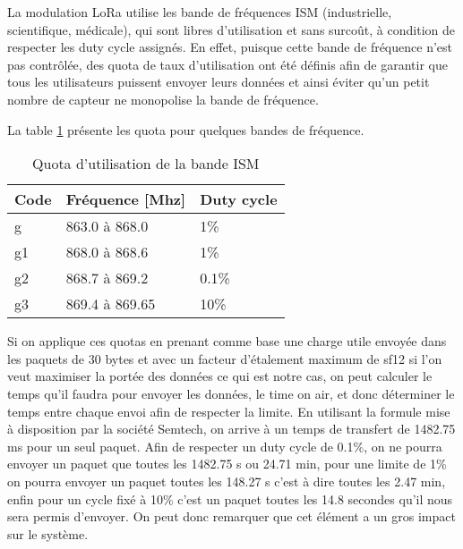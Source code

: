 La modulation LoRa utilise les bande de fréquences ISM (industrielle, scientifique, médicale), qui sont libres d'utilisation et sans surcoût, à condition de respecter les duty cycle assignés. En effet, puisque cette bande de fréquence n'est pas contrôlée, des quota de taux d'utilisation ont été définis afin de garantir que tous les utilisateurs puissent envoyer leurs données et ainsi éviter qu'un petit nombre de capteur ne monopolise la bande de fréquence. \cite{ism_bands}

La table \ref{tab:bande_ism} présente les quota pour quelques bandes de fréquence.

\begin{table}[htb]
\caption{Quota d'utilisation de la bande ISM}
\label{tab:bande_ism}
\centering
\begin{tabular}{ l l l }
\toprule
Code & Fréquence [Mhz] & Duty cycle \\
\midrule
g & 863.0 à 868.0 & 1\% \\
g1 & 868.0 à 868.6 & 1\% \\
g2 & 868.7 à 869.2 & 0.1\% \\
g3 & 869.4 à 869.65 & 10\% \\
\bottomrule 
\end{tabular}
\end{table}

Si on applique ces quotas en prenant comme base une charge utile envoyée dans les paquets de 30 bytes et avec un facteur d'étalement maximum de sf12 si l'on veut maximiser la portée des données ce qui est notre cas, on peut calculer le temps qu'il faudra pour envoyer les données, le time on air, et donc déterminer le temps entre chaque envoi afin de respecter la limite. En utilisant la formule mise à disposition par la société Semtech, on arrive à un temps de transfert de 1482.75 ms pour un seul paquet. Afin de respecter un duty cycle de 0.1\%, on ne pourra envoyer un paquet que toutes les 1482.75 s ou 24.71 min, pour une limite de 1\% on pourra envoyer un paquet toutes les 148.27 s c'est à dire toutes les 2.47 min, enfin pour un cycle fixé à 10\% c'est un paquet toutes les 14.8 secondes qu'il nous sera permis d'envoyer. On peut donc remarquer que cet élément a un gros impact sur le système. \cite{lora_design_guide}

